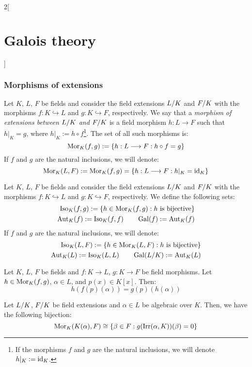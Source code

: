 \documentclass[../../../main.tex]{subfiles}
\begin{document}
\begin{multicols}{2}[\section{Galois theory}]
  \subsubsection*{Morphisms of extensions}
  \begin{definition}
    Let $K$, $L$, $F$ be fields and consider the field extensions $\quot{L}{K}$ and $\quot{F}{K}$ with the morphisms $f:K\hookrightarrow L$ and $g:K\hookrightarrow F$, respectively. We say that a \textit{morphism of extensions between $\quot{L}{K}$ and $\quot{F}{K}$} is a field morphism $h:L\rightarrow F$ such that $h|_K=g$, where $h|_K:=h\circ f$\footnote{If the morphisms $f$ and $g$ are the natural inclusions, we will denote $h|_K:=\mathrm{id}_K$.}. The set of all such morphisms is:
    $$\operatorname{Mor}_K(f,g):=\{h:L\longrightarrow F:h\circ f=g\}$$
    If $f$ and $g$ are the natural inclusions, we will denote: $$\operatorname{Mor}_K(L,F):=\operatorname{Mor}_K(f,g)=\{h:L\longrightarrow F:h|_K=\mathrm{id}_K\}$$
  \end{definition}
  \begin{definition}
    Let $K$, $L$, $F$ be fields and consider the field extensions $\quot{L}{K}$ and $\quot{F}{K}$ with the morphisms $f:K\hookrightarrow L$ and $g:K\hookrightarrow F$, respectively. We define the following sets:
    \begin{align*}
      \operatorname{Iso}_K(f,g):=\{h\in\operatorname{Mor}_K(f,g):h\text{ is bijective}\} \\
      \operatorname{Aut}_K(f):=\operatorname{Iso}_K(f,f)\qquad\operatorname{Gal}(f):=\operatorname{Aut}_K(f)
    \end{align*}
    If $f$ and $g$ are the natural inclusions, we will denote:
    \begin{align*}
      \Iso_K(L,F):=\{h\in\Mor_K(L,F):h\text{ is bijective}\} \\
      \Aut_K(L):=\Iso_K(L,L)\qquad\textstyle\Gal(\quot{L}{K}):=\Aut_K(L)
    \end{align*}
  \end{definition}
  \begin{lemma}
    Let $K$, $L$, $F$ be fields and $f:K\rightarrow L$, $g:K \rightarrow F$ be field morphisms. Let $h\in\operatorname{Mor}_K(f,g)$, $\alpha\in L$, and $p(x)\in K[x]$. Then: $$h(f(p)(\alpha))=g(p)(h(\alpha))$$
  \end{lemma}
  \begin{lemma}
    Let $\quot{L}{K}$, $\quot{F}{K}$ be field extensions and $\alpha\in L$ be algebraic over $K$. Then, we have the following bijection: $$\operatorname{Mor}_K(K(\alpha),F)\cong\{\beta\in F:g(\operatorname{Irr}(\alpha,K))(\beta)=0\}$$
  \end{lemma}
  \begin{corollary}

\end{corollary}
\end{multicols}
\end{document}
